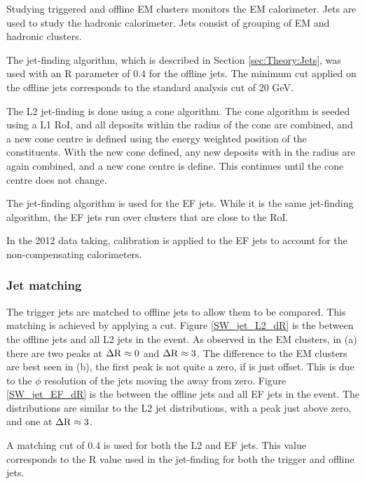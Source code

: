 
Studying triggered and offline EM clusters monitors the EM calorimeter. 
Jets are used to study the hadronic calorimeter.
Jets consist of grouping of EM and hadronic clusters.

The \antikt{} jet-finding algorithm, which is described in Section \ref{sec:Theory:Jets}, was used with an R parameter of 0.4 for the offline jets.
The minimum \pt{} cut applied on the offline jets corresponds to the standard analysis cut of 20 GeV.


The L2 jet-finding is done using a cone algorithm.
The cone algorithm is seeded using a L1 RoI, and all deposits within the radius of the cone are combined, and a new cone centre is defined using the energy weighted position of the constituents.
With the new cone defined, any new deposits with in the radius are again combined, and a new cone centre is define.
This continues until the cone centre does not change.

The \antikt{} jet-finding algorithm is used for the EF jets. 
While it is the same jet-finding algorithm, the EF jets run over clusters that are close to the RoI.

In the 2012 data taking, calibration is applied to the EF jets to account for the non-compensating calorimeters. 

\subsubsection{Jet matching}

The trigger jets are matched to offline jets to allow them to be compared.
This matching is achieved by applying a \dr{} cut.
Figure \ref{SW_jet_L2_dR} is the \dr{} between the offline jets and all L2 jets in the event.
As observed in the EM clusters, in (a) there are two peaks at $\mbox{$\Delta{\rm R}$}{}\approx0$ and $\mbox{$\Delta{\rm R}$}{}\approx3$.
The difference to the EM clusters are best seen in (b), the first peak is not quite a zero, if is just offset.
This is due to the $\phi$ resolution of the jets moving the \dphi{} away from zero. 
Figure \ref{SW_jet_EF_dR} is the \dr{} between the offline jets and all EF jets in the event.
The distributions are similar to the L2 jet \dr{} distributions, with a peak just above zero, and one at $\mbox{$\Delta{\rm R}$}{}\approx3$. 

A \dr{} matching cut of 0.4 is used for both the L2 and EF jets.
This value corresponds to the R value used in the jet-finding for both the trigger and offline jets.

